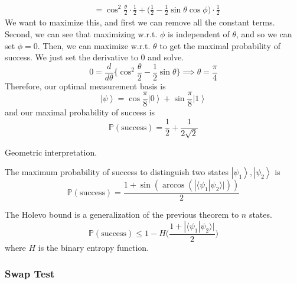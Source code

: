\documentclass{article}
\newcommand{\ket}[1]{\ensuremath{\left|#1\right\rangle}}
\newcommand{\braket}[2]{\langle #1 | #2 \rangle}
\newcounter{theorem}[section]
\newcounter{example}[section]
\begin{document}
\begin{example}
\begin{align}
                                   & = \cos^2 \frac{\theta}{2} \cdot \frac{1}{2} + \bigg( \frac{1}{2} - \frac{1}{2} \sin{\theta} \cos{\phi} \bigg) \cdot \frac{1}{2}
      \end{align}
      We want to maximize this, and first we can remove all the constant terms. Second, we can see that maximizing w.r.t. $\phi$ is independent of $\theta$, and so we can set $\phi = 0$. Then, we can maximize w.r.t. $\theta$ to get the maximal probability of success. We just set the derivative to $0$ and solve. 
      \begin{equation}
        0 = \frac{d}{d\theta} \bigg\{ \cos^2 \frac{\theta}{2} - \frac{1}{2} \sin{\theta} \bigg\} \implies  \theta = \frac{\pi}{4}
      \end{equation}
      Therefore, our optimal measurement basis is 
      \begin{equation}
        \ket{\psi} = \cos\frac{\pi}{8} \ket{0} + \sin\frac{\pi}{8} \ket{1} 
      \end{equation}
      and our maximal probability of success is 
      \begin{equation}
        \mathbb{P}(\text{success}) = \frac{1}{2} + \frac{1}{2 \sqrt{2}}
      \end{equation}
    \end{example}

    Geometric interpretation. 

    \begin{theorem}[]
      \label{thm:maximum-probability-success-distinguish-two}
      The maximum probability of success to distinguish two states $\ket{\psi_1}, \ket{\psi_2}$ is 
      \begin{equation}
        \mathbb{P}(\text{success}) = \frac{1 + \sin(\arccos(|\braket{\psi_1}{\psi_2}|))}{2}
      \end{equation}
    \end{theorem}

    \begin{theorem}
      \label{thm:holevo-bound}
      The Holevo bound is a generalization of the previous theorem to $n$ states. 
      \begin{equation}
        \mathbb{P}(\text{success}) \leq 1 - H\bigg( \frac{1 + |\braket{\psi_1}{\psi_2}|}{2} \bigg)
      \end{equation}
      where $H$ is the binary entropy function.
    \end{theorem}

    \subsubsection{Swap Test}
\end{document}
